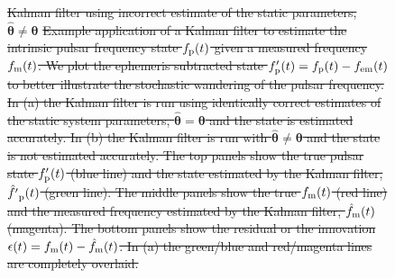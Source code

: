 \documentclass[fleqn,usenatbib,useAMS]{mnras}
\providecommand{\DIFdel}[1]{{\protect\color{red}\sout{#1}}}                      %
\providecommand{\DIFdelFL}[1]{\DIFdel{#1}} %
\providecommand{\DIFaddbeginFL}{} %
\providecommand{\DIFaddendFL}{} %
\providecommand{\DIFdelbeginFL}{} %
\providecommand{\DIFdelendFL}{} %
\newcommand{\DIFscaledelfig}{0.5}
\newlength{\DIFdelgraphicswidth} %
\newlength{\DIFdelgraphicsheight} %
\newcommand{\DIFaddincludegraphics}[2][]{{\color{blue}\fbox{\DIFOincludegraphics[#1]{#2}}}} %
\newcommand{\DIFdelincludegraphics}[2][]{%
\sbox{\DIFdelgraphicsbox}{\DIFOincludegraphics[#1]{#2}}%
\settoboxwidth{\DIFdelgraphicswidth}{\DIFdelgraphicsbox} %
\settoboxtotalheight{\DIFdelgraphicsheight}{\DIFdelgraphicsbox} %
\scalebox{\DIFscaledelfig}{%
\parbox[b]{\DIFdelgraphicswidth}{\usebox{\DIFdelgraphicsbox}\\[-\baselineskip] \rule{\DIFdelgraphicswidth}{0em}}\llap{\resizebox{\DIFdelgraphicswidth}{\DIFdelgraphicsheight}{%
\setlength{\unitlength}{\DIFdelgraphicswidth}%
\begin{picture}(1,1)%
\thicklines\linethickness{2pt} %
{\color[rgb]{1,0,0}\put(0,0){\framebox(1,1){}}}%
{\color[rgb]{1,0,0}\put(0,0){\line( 1,1){1}}}%
{\color[rgb]{1,0,0}\put(0,1){\line(1,-1){1}}}%
\end{picture}%
}\hspace*{3pt}}} %
} %
\DeclareRobustCommand{\DIFaddbeginFL}{\DIFOaddbeginFL \let\includegraphics\DIFaddincludegraphics} %
\DeclareRobustCommand{\DIFaddendFL}{\DIFOaddendFL \let\includegraphics\DIFOincludegraphics} %
\DeclareRobustCommand{\DIFdelbeginFL}{\DIFOdelbeginFL \let\includegraphics\DIFdelincludegraphics} %
\DeclareRobustCommand{\DIFdelendFL}{\DIFOaddendFL \let\includegraphics\DIFOincludegraphics} %
\begin{document}
\begin{figure}
	\DIFdelbeginFL %
{%
\DIFdelFL{Kalman filter using incorrect estimate of the static parameters, $\hat{\boldsymbol{\theta}} \neq \boldsymbol{\theta}$}}
{%
\DIFdelFL{Example application of a Kalman filter to estimate the intrinsic pulsar frequency state $f_{\rm p}(t)$ given a measured frequency $f_{\rm m}(t)$. We plot the ephemeris subtracted state $f'_{\rm p}(t) = f_{\rm p}(t) - f_{\rm em} (t)$ to better illustrate the stochastic wandering of the pulsar frequency. In (a) the Kalman filter is run using identically correct estimates of the static system parameters, $\hat{\boldsymbol{\theta}} = \boldsymbol{\theta}$ and the state is estimated accurately. In (b) the Kalman filter is run with $\hat{\boldsymbol{\theta}} \neq \boldsymbol{\theta}$ and the state is not estimated accurately. The top panels show the true pulsar state $f'_{\rm p}(t)$ (blue line) and the state estimated by the Kalman filter, $\hat{f'}_{\rm p}(t)$ (green line). The middle panels show the true $f_{\rm m}(t)$ (red line) and the measured frequency estimated  by the Kalman filter, $\hat{f}_{\rm m}(t)$ (magenta). The bottom panels show the residual or the innovation $\epsilon(t) =f_{\rm m}(t) - \hat{f}_{\rm m}(t)$. In (a) the green/blue and red/magenta lines are completely overlaid.}}
\DIFdelendFL \DIFaddbeginFL \label{fig:kalman_example}
\DIFaddendFL \end{figure}
\end{document}

